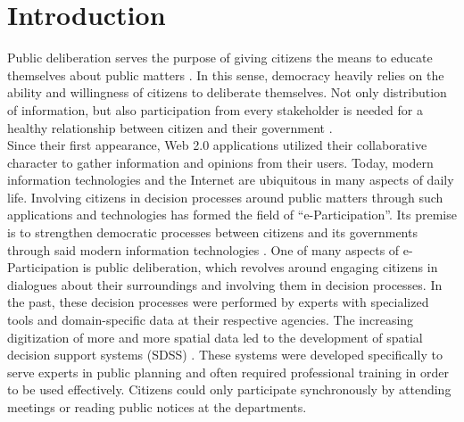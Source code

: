 \section{Introduction}
\label{chap:introduction}
Public deliberation serves the purpose of giving citizens the means to educate themselves about public matters \cite{page1996deliberates}. In this sense, democracy heavily relies on the ability and willingness of citizens to deliberate themselves. Not only distribution of information, but also participation from every stakeholder is needed for a healthy relationship between citizen and their government \cite{Arnstein1969_citizen_participation}.\\
Since their first appearance, Web 2.0 applications utilized their collaborative character to gather information and opinions from their users. Today, modern information technologies and the Internet are ubiquitous in many aspects of daily life. Involving citizens in decision processes around public matters through such applications and technologies has formed the field of ``e-Participation''. Its premise is to strengthen democratic processes between citizens and its governments through said modern information technologies \cite{Saebo_eParticipation, Medaglia2012_eParticipation}. One of many aspects of e-Participation is public deliberation, which revolves around engaging citizens in dialogues about their surroundings and involving them in decision processes. In the past, these decision processes were performed by experts with specialized tools and domain-specific data at their respective agencies. The increasing digitization of more and more spatial data led to the development of spatial decision support systems (SDSS) \cite{densham_sdss}. These systems were developed specifically to serve experts in public planning and often required professional training in order to be used effectively. Citizens could only participate synchronously by attending meetings or reading public notices at the departments. 

